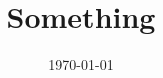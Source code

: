 \documentclass{amsart}
\title{Something}
\date{\today}
\begin{document}
\maketitle


\Blinddocument
\end{document}
